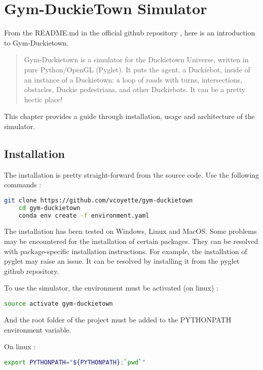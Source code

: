 \chapter{Gym-DuckieTown Simulator}

From the README.md in the official github repository \cite{gym_duckietown}, here is an introduction to Gym-Duckietown.

 \begin{quotation}
    Gym-Duckietown is a simulator for the Duckietown Universe, written in pure Python/OpenGL (Pyglet). It puts the agent, a Duckiebot, inside of an instance of a Duckietown: a loop of roads with turns, intersections, obstacles, Duckie pedestrians, and other Duckiebots. It can be a pretty hectic place!
\end{quotation}

 This chapter provides a guide through installation, usage and architecture of the simulator.

\section{Installation}

The installation is pretty straight-forward from the source code. Use the following commands :

\begin{lstlisting}[language=bash]
    git clone https://github.com/vcoyette/gym-duckietown
    cd gym-duckietown
    conda env create -f environment.yaml
\end{lstlisting}

The installation has been tested on Windows, Linux and MacOS. Some problems may be encountered for the installation of certain packages.
They can be resolved with package-specific installation instructions.
For example, the installation of pyglet may raise an issue.
It can be resolved by installing it from the pyglet github repository.

To use the simulator, the environment must be activated (on linux) :

\begin{lstlisting}[language=bash]
    source activate gym-duckietown
\end{lstlisting}

And the root folder of the project must be added to the PYTHONPATH environment variable.

On linux :
\begin{lstlisting}[language=bash]
    export PYTHONPATH="${PYTHONPATH}:`pwd`"
\end{lstlisting}

